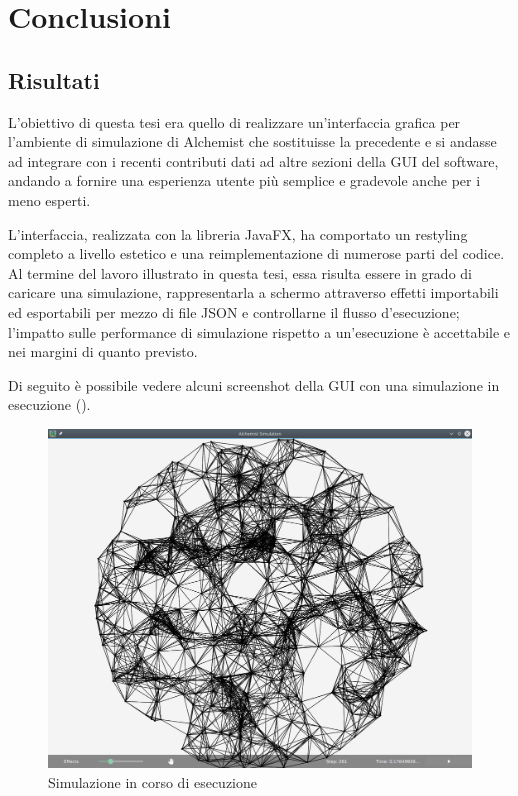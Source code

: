 
\chapter{Conclusioni}\label{ch:conclusioni}
    \section{Risultati}\label{sec:risultati}
        L'obiettivo di questa tesi era quello di realizzare un'interfaccia grafica per l'ambiente di simulazione di Alchemist che sostituisse la precedente e si andasse ad integrare con i recenti contributi dati ad altre sezioni della GUI del software, andando a fornire una esperienza utente più semplice e gradevole anche per i meno esperti.

        L'interfaccia, realizzata con la libreria JavaFX, ha comportato un restyling completo a livello estetico e una reimplementazione di numerose parti del codice.
        Al termine del lavoro illustrato in questa tesi, essa risulta essere in grado di caricare una simulazione, rappresentarla a schermo attraverso effetti importabili ed esportabili per mezzo di file JSON e controllarne il flusso d'esecuzione;
        l'impatto sulle performance di simulazione rispetto a un'esecuzione  è accettabile e nei margini di quanto previsto.

        Di seguito è possibile vedere alcuni screenshot della GUI con una simulazione in esecuzione ().

        \begin{figure}[htbp]
            \centering
            \includegraphics[scale=0.45]{img/withNodes/simWithNodes}
            \caption{Simulazione in corso di esecuzione}
            \label{fig:simWithNodes}
        \end{figure}


